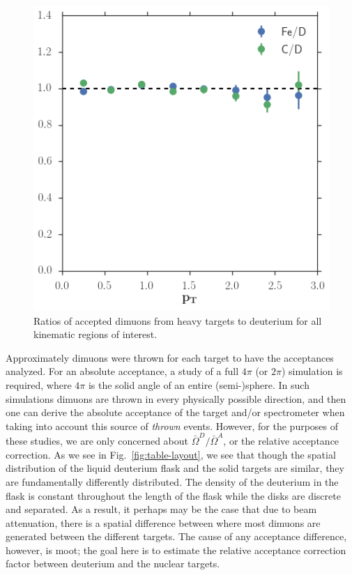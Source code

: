 \begin{figure}
	\includegraphics[height=0.3\textheight]{figures/analysis/pt-acceptance.png}
	\caption{Ratios of accepted dimuons from heavy targets to deuterium for all kinematic regions of interest.}
	\label{fig:targ-acceptance}
\end{figure}

Approximately \unit[800,000]{dimuons} were thrown for each target to have the acceptances analyzed. For an absolute acceptance, a study of a full $4\pi$ (or $2\pi$) simulation is required, where $4\pi$ is the solid angle of an entire (semi-)sphere. In such simulations dimuons are thrown in every physically possible direction, and then one can derive the absolute acceptance of the target and/or spectrometer when taking into account this source of \emph{thrown} events. However, for the purposes of these studies, we are only concerned about $\bar{\Omega}^D/\bar{\Omega}^A$, or the relative acceptance correction. As we see in Fig.~\ref{fig:table-layout}, we see that though the spatial distribution of the liquid deuterium flask and the solid targets are similar, they are fundamentally differently distributed. The density of the deuterium in the flask is constant throughout the length of the flask while the disks are discrete and separated. As a result, it perhaps may be the case that due to beam attenuation, there is a spatial difference between where most dimuons are generated between the different targets. The cause of any acceptance difference, however, is moot; the goal here is to estimate the relative acceptance correction factor between deuterium and the nuclear targets.

